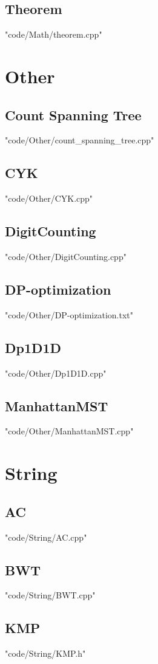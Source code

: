 \documentclass[landscape, 8pt,twocolumn,oneside, a4paper]{article}
\begin{document}
\subsection{Theorem}
 {"code/Math/theorem.cpp"}
\section{Other}
\subsection{Count Spanning Tree}
 {"code/Other/count_spanning_tree.cpp"}
\subsection{CYK}
 {"code/Other/CYK.cpp"}
\subsection{DigitCounting}
 {"code/Other/DigitCounting.cpp"}
\subsection{DP-optimization}
 {"code/Other/DP-optimization.txt"}
\subsection{Dp1D1D}
 {"code/Other/Dp1D1D.cpp"}
\subsection{ManhattanMST}
 {"code/Other/ManhattanMST.cpp"}
\section{String}
\subsection{AC}
 {"code/String/AC.cpp"}
\subsection{BWT}
 {"code/String/BWT.cpp"}
\subsection{KMP}
 {"code/String/KMP.h"}
\end{document}

